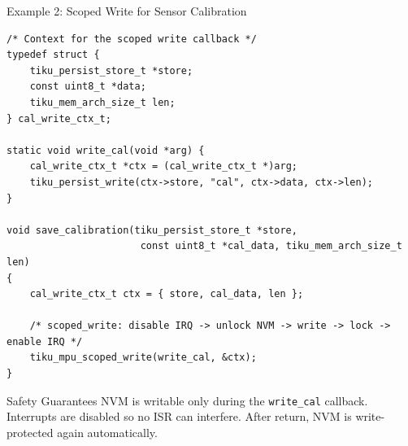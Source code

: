 \documentclass[aspectratio=169, 10pt]{beamer}
\begin{document}
\begin{frame}[fragile]{Example 2: Scoped Write for Sensor Calibration}
\begin{lstlisting}[style=cstyle]
/* Context for the scoped write callback */
typedef struct {
    tiku_persist_store_t *store;
    const uint8_t *data;
    tiku_mem_arch_size_t len;
} cal_write_ctx_t;

static void write_cal(void *arg) {
    cal_write_ctx_t *ctx = (cal_write_ctx_t *)arg;
    tiku_persist_write(ctx->store, "cal", ctx->data, ctx->len);
}

void save_calibration(tiku_persist_store_t *store,
                       const uint8_t *cal_data, tiku_mem_arch_size_t len)
{
    cal_write_ctx_t ctx = { store, cal_data, len };

    /* scoped_write: disable IRQ -> unlock NVM -> write -> lock -> enable IRQ */
    tiku_mpu_scoped_write(write_cal, &ctx);
}
\end{lstlisting}

\vspace{0.3em}
\begin{block}{Safety Guarantees}
NVM is writable only during the \texttt{write\_cal} callback.
Interrupts are disabled so no ISR can interfere. After return,
NVM is write-protected again automatically.
\end{block}
\end{frame}
\end{document}
